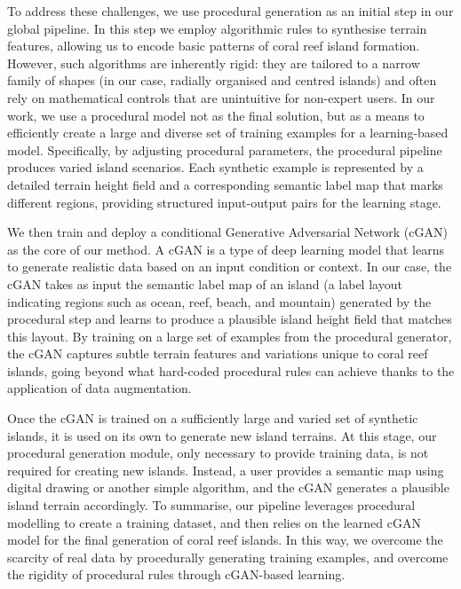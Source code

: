 To address these challenges, we use procedural generation as an initial step in our global pipeline. In this step we employ algorithmic rules to synthesise terrain features, allowing us to encode basic patterns of coral reef island formation. However, such algorithms are inherently rigid: they are tailored to a narrow family of shapes (in our case, radially organised and centred islands) and often rely on mathematical controls that are unintuitive for non-expert users. In our work, we use a procedural model not as the final solution, but as a means to efficiently create a large and diverse set of training examples for a learning-based model. Specifically, by adjusting procedural parameters, the procedural pipeline produces varied island scenarios. Each synthetic example is represented by a detailed terrain height field and a corresponding semantic label map that marks different regions, providing structured input-output pairs for the learning stage.

We then train and deploy a conditional Generative Adversarial Network (cGAN) as the core of our method. A cGAN is a type of deep learning model that learns to generate realistic data based on an input condition or context. In our case, the cGAN takes as input the semantic label map of an island (a label layout indicating regions such as ocean, reef, beach, and mountain) generated by the procedural step and learns to produce a plausible island height field that matches this layout. By training on a large set of examples from the procedural generator, the cGAN captures subtle terrain features and variations unique to coral reef islands, going beyond what hard-coded procedural rules can achieve thanks to the application of data augmentation.

Once the cGAN is trained on a sufficiently large and varied set of synthetic islands, it is used on its own to generate new island terrains. At this stage, our procedural generation module, only necessary to provide training data, is not required for creating new islands. Instead, a user provides a semantic map using digital drawing or another simple algorithm, and the cGAN generates a plausible island terrain accordingly. To summarise, our pipeline leverages procedural modelling to create a training dataset, and then relies on the learned cGAN model for the final generation of coral reef islands. In this way, we overcome the scarcity of real data by procedurally generating training examples, and overcome the rigidity of procedural rules through cGAN-based learning.


